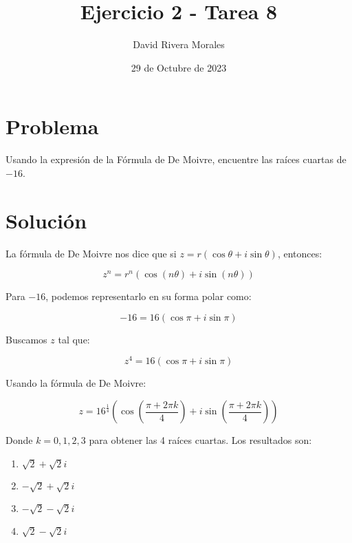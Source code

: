 \documentclass{article}
\title{Ejercicio 2 - Tarea 8}
\author{David Rivera Morales}
\date{29 de Octubre de 2023}
\begin{document}
\maketitle

\section*{Problema}

Usando la expresión de la Fórmula de De Moivre, encuentre las raíces cuartas de \(-16\).

\section*{Solución}

La fórmula de De Moivre nos dice que si \( z = r(\cos \theta + i \sin \theta) \), entonces:

\[
z^n = r^n (\cos(n\theta) + i \sin(n\theta))
\]

Para \(-16\), podemos representarlo en su forma polar como:

\[
-16 = 16(\cos \pi + i \sin \pi)
\]

Buscamos \( z \) tal que:

\[
z^4 = 16(\cos \pi + i \sin \pi)
\]

Usando la fórmula de De Moivre:

\[
z = 16^{\frac{1}{4}} \left( \cos\left(\frac{\pi + 2\pi k}{4}\right) + i \sin\left(\frac{\pi + 2\pi k}{4}\right) \right)
\]

Donde \( k = 0, 1, 2, 3 \) para obtener las 4 raíces cuartas. Los resultados son:

\begin{enumerate}
    \item \( \sqrt{2} + \sqrt{2}i \)
    \item \( -\sqrt{2} + \sqrt{2}i \)
    \item \( -\sqrt{2} - \sqrt{2}i \)
    \item \( \sqrt{2} - \sqrt{2}i \)
\end{enumerate}
\end{document}
